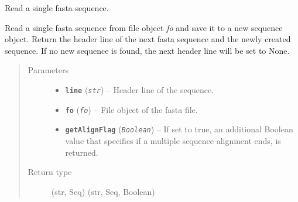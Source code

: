 \documentclass[letterpaper,10pt,english]{sphinxmanual}
\begin{document}
\begin{fulllineitems}
\label{fasta:libPoMo.fasta.read_seq_from_fo}
Read a single fasta sequence.

Read a single fasta sequence from file object \emph{fo} and save it to
a new {\hyperref[seqbase:libPoMo.seqbase.Seq]{}} sequence object. Return
the header line of the next fasta sequence and the newly created
sequence. If no new sequence is found, the next header line will
be set to None.
\begin{quote}\begin{description}
\item[{Parameters}] \leavevmode\begin{itemize}
\item {} 
\textbf{\texttt{line}} (\emph{\texttt{str}}) -- Header line of the sequence.

\item {} 
\textbf{\texttt{fo}} (\emph{\texttt{fo}}) -- File object of the fasta file.

\item {} 
\textbf{\texttt{getAlignFlag}} (\emph{\texttt{Boolean}}) -- If set to true, an additional Boolean
value that specifies if a multiple sequence alignment ends, is
returned.

\end{itemize}

\item[{Return type}] \leavevmode
(str, Seq) \textbar{} (str, Seq, Boolean)

\end{description}\end{quote}

\end{fulllineitems}

\end{document}
